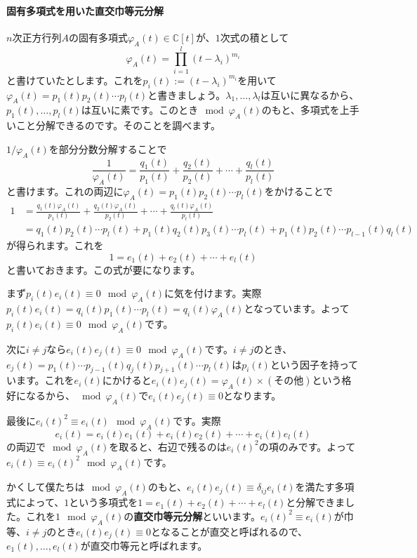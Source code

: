 \paragraph{固有多項式を用いた直交巾等元分解}

$n$次正方行列$A$の固有多項式$\varphi_A(t) \in \mathbb{C}[t]$が、$1$次式の積として
\[
\varphi_A(t) = \prod_{i = 1}^l (t - \lambda_i)^{m_i}
\]
と書けていたとします。これを$p_i(t) := (t - \lambda_i)^{m_i}$を用いて$\varphi_A(t) = p_1(t) p_2(t) \cdots p_l(t)$と書きましょう。$\lambda_1, \ldots, \lambda_l$は互いに異なるから、$p_1(t), \ldots, p_l(t)$は互いに素です。このとき$\!\!\!\mod \varphi_A(t)$のもと、多項式を上手いこと分解できるのです。そのことを調べます。

$1/\varphi_A(t)$を部分分数分解することで
\[
\frac{1}{\varphi_A(t)} = \frac{q_1(t)}{p_1(t)} + \frac{q_2(t)}{p_2(t)} + \cdots + \frac{q_l(t)}{p_l(t)}
\]
と書けます。これの両辺に$\varphi_A(t) = p_1(t) p_2(t) \cdots p_l(t)$をかけることで
\begin{align*}
1 &= \frac{q_1(t)\varphi_A(t)}{p_1(t)} + \frac{q_2(t)\varphi_A(t)}{p_2(t)} + \cdots + \frac{q_l(t)\varphi_A(t)}{p_l(t)} \\
&= q_1(t) p_2(t) \cdots p_l(t) + p_1(t) q_2(t) p_3(t) \cdots p_l(t) + p_1(t) p_2(t) \cdots p_{l - 1}(t) q_l(t)
\end{align*}
が得られます。これを
\[
1 = e_1(t) + e_2(t) + \cdots + e_l(t)
\]
と書いておきます。この式が要になります。

まず$p_i(t) e_i(t) \equiv 0 \mod \varphi_A(t)$に気を付けます。実際$p_i(t) e_i(t) = q_i(t) p_1(t) \cdots p_l(t) = q_i(t) \varphi_A(t)$となっています。よって$p_i(t) e_i(t) \equiv 0 \mod \varphi_A(t)$です。

次に$i \neq j$なら$e_i(t) e_j (t) \equiv 0 \mod \varphi_A(t)$です。$i \neq j$のとき、$e_j(t) = p_1(t) \cdots p_{j - 1}(t) q_j(t) p_{j + 1}(t) \cdots p_l(t)$は$p_i(t)$という因子を持っています。これを$e_i(t)$にかけると$e_i(t) e_j(t) = \varphi_A(t) \times (\text{その他})$という格好になるから、$\mod \varphi_A(t)$で$e_i(t) e_j(t) \equiv 0$となります。

最後に$e_i(t)^2 \equiv e_i(t) \mod \varphi_A(t)$です。実際
\[
e_i(t) = e_i(t) e_1(t) + e_i(t) e_2(t) + \cdots + e_i(t) e_l(t)
\]
の両辺で$\!\!\!\mod \varphi_A(t)$を取ると、右辺で残るのは$e_i(t)^2$の項のみです。よって$e_i(t) \equiv e_i(t)^2 \mod \varphi_A(t)$です。

かくして僕たちは$\!\!\!\mod \varphi_A(t)$のもと、$e_i(t) e_j(t) \equiv \delta_{ij} e_i(t)$を満たす多項式によって、$1$という多項式を$1 = e_1(t) + e_2(t) + \cdots + e_l(t)$と分解できました。これを$1 \mod \varphi_A(t)$の\textbf{直交巾等元分解}といいます。$e_i(t)^2 \equiv e_i(t)$が巾等、$i \neq j$のとき$e_i(t) e_j(t) \equiv 0$となることが直交と呼ばれるので、$e_1(t), \ldots, e_l(t)$が直交巾等元と呼ばれます。

